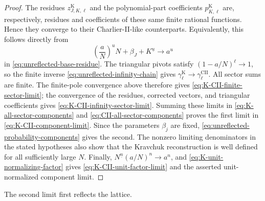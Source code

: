 \documentclass[10pt]{amsart}
\newcommand{\fall}[2]{#1^{\underline{#2}}}
\theoremstyle{plain}
\theoremstyle{definition}
\theoremstyle{remark}
\begin{document}
\begin{proof}
The residues \(z_{J,K,\ell}^{\mathrm K}\) and the polynomial-part
coefficients \(p_{K,\ell}^{\mathrm K}\) are, respectively, residues and
coefficients of these same finite rational functions. Hence they converge
to their Charlier-II-like counterparts. Equivalently, this follows
directly from
\[
 \left(\frac aN\right)^u
 \fall{N+\beta_J+K}{u}\longrightarrow a^u
\]
in \eqref{eq:unreflected-base-residue}.  The triangular pivots satisfy
\((1-a/N)^\ell\to1\), so the finite inverse
\eqref{eq:unreflected-infinity-chain} gives
\(\gamma_\ell^{\mathrm K}\to\gamma_\ell^{\mathrm{CII}}\).
All sector sums are finite. The finite-pole convergence above therefore
gives \eqref{eq:K-CII-finite-sector-limit}; the convergence of the
residues, corrected vectors, and triangular coefficients gives
\eqref{eq:K-CII-infinity-sector-limit}. Summing these limits in
\eqref{eq:K-all-sector-components} and
\eqref{eq:CII-all-sector-components} proves the first limit in
\eqref{eq:K-CII-component-limit}. Since the parameters
\(\beta_j\) are fixed, \eqref{eq:unreflected-probability-components}
gives the second.  The nonzero limiting denominators in the stated
hypotheses also show that the Kravchuk reconstruction is well defined for
all sufficiently large \(N\).  Finally,
\(\fall{N}{n}(a/N)^n\to a^n\), and
\eqref{eq:K-unit-normalizing-factor} gives
\eqref{eq:K-CII-unit-factor-limit} and the asserted unit-normalized
component limit.
\end{proof}

The second limit first reflects the lattice.
\end{document}
